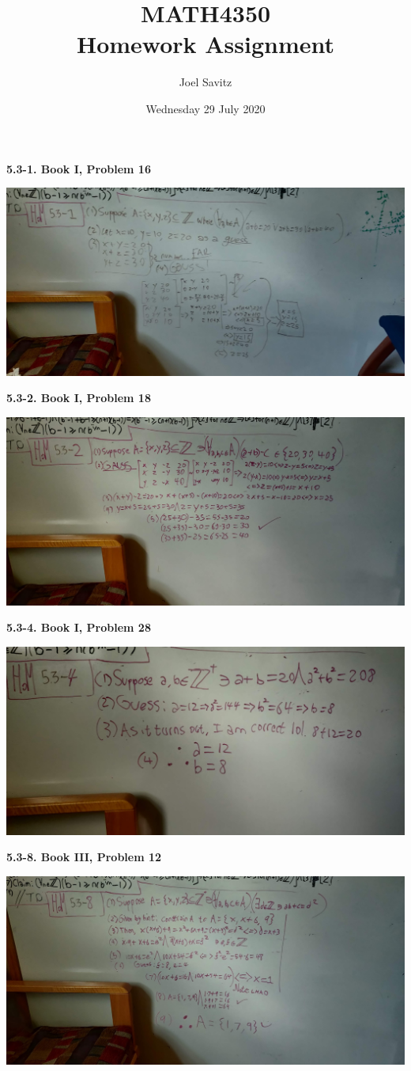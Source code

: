 \documentclass[12pt]{article}
\title{MATH4350 \\ Homework Assignment}
\author{Joel Savitz}
\date{Wednesday 29 July 2020}
\begin{document}
\maketitle

\noindent
\textbf{5.3-1. Book I, Problem 16}

\medskip
\includegraphics[scale=0.08]{1.jpg}
\pagebreak

\noindent
\textbf{5.3-2. Book I, Problem 18}

\medskip
\includegraphics[scale=0.08]{2.jpg}
\pagebreak


\noindent
\textbf{5.3-4. Book I, Problem 28}

\medskip
\includegraphics[scale=0.08]{4.jpg}
\pagebreak


\noindent
\textbf{5.3-8. Book III, Problem 12}

\medskip
\includegraphics[scale=0.08]{8.jpg}
\end{document}
